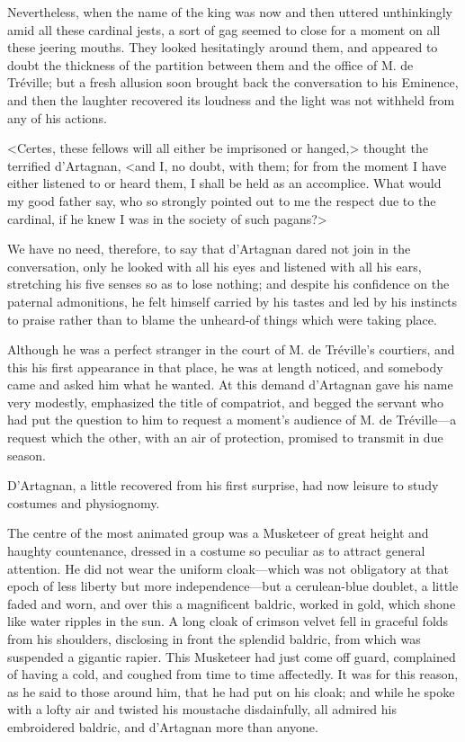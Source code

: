 Nevertheless, when the name of the king was now and then uttered unthinkingly amid all these cardinal jests, a sort of gag seemed to close for a moment on all these jeering mouths. They looked hesitatingly around them, and appeared to doubt the thickness of the partition between them and the office of M. de Tréville; but a fresh allusion soon brought back the conversation to his Eminence, and then the laughter recovered its loudness and the light was not withheld from any of his actions. 

<Certes, these fellows will all either be imprisoned or hanged,> thought the terrified d'Artagnan, <and I, no doubt, with them; for from the moment I have either listened to or heard them, I shall be held as an accomplice. What would my good father say, who so strongly pointed out to me the respect due to the cardinal, if he knew I was in the society of such pagans?> 

We have no need, therefore, to say that d'Artagnan dared not join in the conversation, only he looked with all his eyes and listened with all his ears, stretching his five senses so as to lose nothing; and despite his confidence on the paternal admonitions, he felt himself carried by his tastes and led by his instincts to praise rather than to blame the unheard-of things which were taking place. 

Although he was a perfect stranger in the court of M. de Tréville's courtiers, and this his first appearance in that place, he was at length noticed, and somebody came and asked him what he wanted. At this demand d'Artagnan gave his name very modestly, emphasized the title of compatriot, and begged the servant who had put the question to him to request a moment's audience of M. de Tréville---a request which the other, with an air of protection, promised to transmit in due season. 

D'Artagnan, a little recovered from his first surprise, had now leisure to study costumes and physiognomy. 

The centre of the most animated group was a Musketeer of great height and haughty countenance, dressed in a costume so peculiar as to attract general attention. He did not wear the uniform cloak---which was not obligatory at that epoch of less liberty but more independence---but a cerulean-blue doublet, a little faded and worn, and over this a magnificent baldric, worked in gold, which shone like water ripples in the sun. A long cloak of crimson velvet fell in graceful folds from his shoulders, disclosing in front the splendid baldric, from which was suspended a gigantic rapier. This Musketeer had just come off guard, complained of having a cold, and coughed from time to time affectedly. It was for this reason, as he said to those around him, that he had put on his cloak; and while he spoke with a lofty air and twisted his moustache disdainfully, all admired his embroidered baldric, and d'Artagnan more than anyone. 


